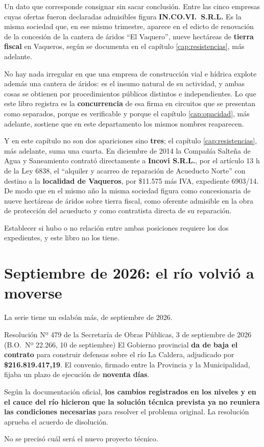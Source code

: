 \begin{cautela}
Un dato que corresponde consignar sin sacar conclusión. Entre las cinco empresas cuyas ofertas fueron declaradas admisibles figura \textbf{IN.CO.VI.\ S.R.L.} Es la misma sociedad que, en ese mismo trimestre, aparece en el edicto de renovación de la concesión de la cantera de áridos ``El Vaquero'', nueve hectáreas de \textbf{tierra fiscal} en Vaqueros, según se documenta en el capítulo \ref{cap:resistencias}, más adelante.

No hay nada irregular en que una empresa de construcción vial e hídrica explote además una cantera de áridos: es el insumo natural de su actividad, y ambas cosas se obtienen por procedimientos públicos distintos e independientes. Lo que este libro registra es la \textbf{concurrencia} de esa firma en circuitos que se presentan como separados, porque es verificable y porque el capítulo \ref{cap:opacidad}, más adelante, sostiene que en este departamento los mismos nombres reaparecen.

Y en este capítulo no son dos apariciones sino \textbf{tres}; el capítulo \ref{cap:resistencias}, más adelante, suma una cuarta. En diciembre de 2014 la Compañía Salteña de Agua y Saneamiento contrató directamente a \textbf{Incovi S.R.L.}, por el artículo 13 h de la Ley 6838, el ``alquiler y acarreo de reparación de Acueducto Norte'' con destino a la \textbf{localidad de Vaqueros}, por \$11.575 más IVA, expediente 6903/14. De modo que en el mismo año la misma sociedad figura como concesionaria de nueve hectáreas de áridos sobre tierra fiscal, como oferente admisible en la obra de protección del acueducto y como contratista directa de su reparación.

Establecer si hubo o no relación entre ambas posiciones requiere los dos expedientes, y este libro no los tiene.
\end{cautela}

\section{Septiembre de 2026: el río volvió a moverse}

La serie tiene un eslabón más, de septiembre de 2026.

\begin{ficha}{Resolución Nº 479 de la Secretaría de Obras Públicas, 3 de septiembre de 2026 (B.O.\ Nº 22.266, 10 de septiembre)}
El Gobierno provincial \textbf{da de baja el contrato} para construir defensas sobre el río La
Caldera, adjudicado por \textbf{\$216.819.417,19}. El convenio, firmado entre la Provincia y
la Municipalidad, fijaba un plazo de ejecución de \textbf{noventa días}.

Según la documentación oficial, \textbf{los cambios registrados en los niveles y en el cauce
del río hicieron que la solución técnica prevista ya no reuniera las condiciones necesarias}
para resolver el problema original. La resolución aprueba el acuerdo de disolución.

No se precisó cuál será el nuevo proyecto técnico.
\end{ficha}

